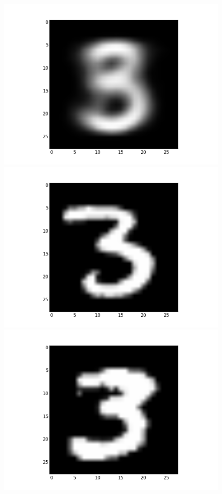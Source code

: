 \documentclass[submit]{harvardml}
\begin{document}
\begin{figure}[ht]
    \centering
    \includegraphics[scale=0.20]{mean-9}
    \includegraphics[scale=0.20]{representative-9-0}
    \includegraphics[scale=0.20]{representative-9-1}

\end{figure}
\end{document}
